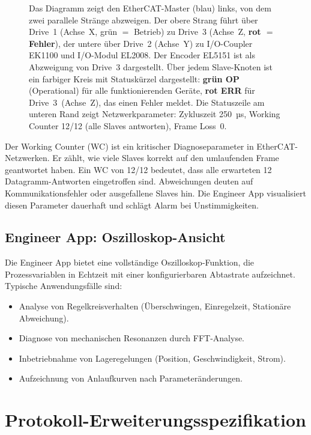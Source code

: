 ﻿\documentclass[12pt,a4paper]{article}
\begin{document}
\begin{figure}[H]
{  Das Diagramm zeigt den EtherCAT-Master (blau) links, von dem zwei parallele Stränge
  abzweigen. Der obere Strang führt über Drive~1 (Achse~X, grün $=$ Betrieb) zu Drive~3
  (Achse~Z, \textbf{rot $=$ Fehler}), der untere über Drive~2 (Achse~Y) zu I/O-Coupler
  EK1100 und I/O-Modul EL2008. Der Encoder EL5151 ist als Abzweigung von Drive~3
  dargestellt. Über jedem Slave-Knoten ist ein farbiger Kreis mit Statuskürzel
  dargestellt: \textbf{grün OP} (Operational) für alle funktionierenden Geräte,
  \textbf{rot ERR} für Drive~3~(Achse~Z), das einen Fehler meldet. Die
  Statuszeile am unteren Rand zeigt Netzwerkparameter: Zykluszeit 250\, µs, Working
  Counter 12/12 (alle Slaves antworten), Frame Loss~0.}
\label{fig:eng_topo_view}
\end{figure}

Der Working Counter (WC) ist ein kritischer Diagnoseparameter in EtherCAT-Netzwerken.
Er zählt, wie viele Slaves korrekt auf den umlaufenden Frame geantwortet haben. Ein WC
von 12/12 bedeutet, dass alle erwarteten 12 Datagramm-Antworten eingetroffen sind.
Abweichungen deuten auf Kommunikationsfehler oder ausgefallene Slaves hin. Die
Engineer App visualisiert diesen Parameter dauerhaft und schlägt Alarm bei
Unstimmigkeiten.

\subsection{Engineer App: Oszilloskop-Ansicht}

Die Engineer App bietet eine vollständige Oszilloskop-Funktion, die Prozessvariablen
in Echtzeit mit einer konfigurierbaren Abtastrate aufzeichnet. Typische Anwendungsfälle
sind:

\begin{itemize}[leftmargin=2em]
  \item Analyse von Regelkreisverhalten (Überschwingen, Einregelzeit, Stationäre
    Abweichung).
  \item Diagnose von mechanischen Resonanzen durch FFT-Analyse.
  \item Inbetriebnahme von Lageregelungen (Position, Geschwindigkeit, Strom).
  \item Aufzeichnung von Anlaufkurven nach Parameteränderungen.
\end{itemize}

\section{Protokoll-Erweiterungsspezifikation}
\label{sec:protocol}
\end{document}
